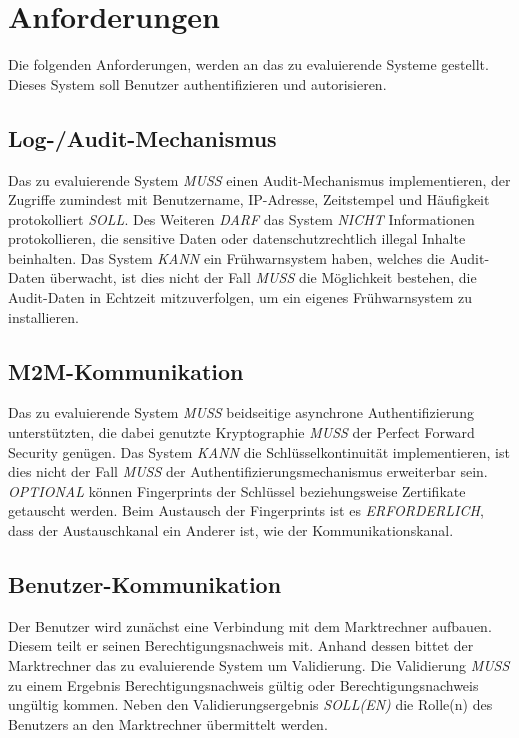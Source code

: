 \documentclass[11pt,a4paper]{report}
\begin{document}
\section{Anforderungen}

Die folgenden Anforderungen, werden an das zu evaluierende Systeme gestellt. Dieses System soll Benutzer authentifizieren und autorisieren. 

\subsection{Log-/Audit-Mechanismus}

Das zu evaluierende System \textit{MUSS} einen Audit-Mechanismus implementieren, der Zugriffe zumindest mit Benutzername, IP-Adresse, Zeitstempel und Häufigkeit protokolliert \textit{SOLL}. Des Weiteren \textit{DARF} das System \textit{NICHT} Informationen protokollieren, die sensitive Daten oder datenschutzrechtlich illegal Inhalte beinhalten. Das System \textit{KANN} ein Frühwarnsystem haben, welches die Audit-Daten überwacht, ist dies nicht der Fall \textit{MUSS} die Möglichkeit bestehen, die Audit-Daten in Echtzeit mitzuverfolgen, um ein eigenes Frühwarnsystem zu installieren.

\subsection{M2M-Kommunikation}

Das zu evaluierende System \textit{MUSS} beidseitige asynchrone Authentifizierung unterstützten, die dabei genutzte Kryptographie \textit{MUSS} der Perfect Forward Security genügen. Das System \textit{KANN} die Schlüsselkontinuität implementieren, ist dies nicht der Fall \textit{MUSS} der Authentifizierungsmechanismus erweiterbar sein. \textit{OPTIONAL} können Fingerprints der Schlüssel beziehungsweise Zertifikate getauscht werden. Beim Austausch der Fingerprints ist es \textit{ERFORDERLICH}, dass der Austauschkanal ein Anderer ist, wie der Kommunikationskanal.

\subsection{Benutzer-Kommunikation}

Der Benutzer wird zunächst eine Verbindung mit dem Marktrechner aufbauen. Diesem teilt er seinen Berechtigungsnachweis mit. Anhand dessen bittet der Marktrechner das zu evaluierende System um Validierung. Die Validierung \textit{MUSS} zu einem Ergebnis Berechtigungsnachweis gültig oder Berechtigungsnachweis ungültig kommen. Neben den Validierungsergebnis \textit{SOLL(EN)} die Rolle(n) des Benutzers an den Marktrechner übermittelt werden.
\end{document}
